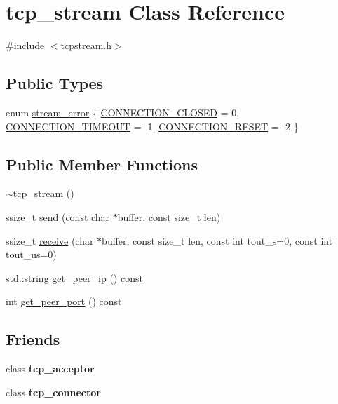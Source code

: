 \hypertarget{classtcp__stream}{}\section{tcp\+\_\+stream Class Reference}
\label{classtcp__stream}


{\ttfamily \#include $<$tcpstream.\+h$>$}

\subsection*{Public Types}
\begin{DoxyCompactItemize}
\item 
enum \hyperlink{classtcp__stream_a1654b581bd89eacae6c5c00bf44bd303}{stream\+\_\+error} \{ \hyperlink{classtcp__stream_a1654b581bd89eacae6c5c00bf44bd303af56262b6dafb79a22137a3459fc8e6c1}{C\+O\+N\+N\+E\+C\+T\+I\+O\+N\+\_\+\+C\+L\+O\+S\+ED} = 0, 
\hyperlink{classtcp__stream_a1654b581bd89eacae6c5c00bf44bd303ab63bfd071e8d91d93ef8723b79563f0e}{C\+O\+N\+N\+E\+C\+T\+I\+O\+N\+\_\+\+T\+I\+M\+E\+O\+UT} = -\/1, 
\hyperlink{classtcp__stream_a1654b581bd89eacae6c5c00bf44bd303a4d1f1bf6e8aa323d3de6ab6254af5e1c}{C\+O\+N\+N\+E\+C\+T\+I\+O\+N\+\_\+\+R\+E\+S\+ET} = -\/2
 \}
\end{DoxyCompactItemize}
\subsection*{Public Member Functions}
\begin{DoxyCompactItemize}
\item 
\hyperlink{classtcp__stream_a5053337af64329d01e1c78cca9d5633e}{$\sim$tcp\+\_\+stream} ()
\item 
ssize\+\_\+t \hyperlink{classtcp__stream_a647c576fed72122b5dc3b6e23c36e210}{send} (const char $\ast$buffer, const size\+\_\+t len)
\item 
ssize\+\_\+t \hyperlink{classtcp__stream_a061ef2188c1cf0eebc7290dbc908f06e}{receive} (char $\ast$buffer, const size\+\_\+t len, const int tout\+\_\+s=0, const int tout\+\_\+us=0)
\item 
std\+::string \hyperlink{classtcp__stream_ac9afe2de961bc45ffb1b614e5718b353}{get\+\_\+peer\+\_\+ip} () const
\item 
int \hyperlink{classtcp__stream_a5562bfad5ec43e358b6bc63386166a50}{get\+\_\+peer\+\_\+port} () const
\end{DoxyCompactItemize}
\subsection*{Friends}
\begin{DoxyCompactItemize}
\item 
\mbox{\label{classtcp__stream_ac753a6c4530e663615a7b160569a446f}} 
class {\bfseries tcp\+\_\+acceptor}
\item 
\mbox{\label{classtcp__stream_a35780d6902edba55e3d463e00117657d}} 
class {\bfseries tcp\+\_\+connector}
\end{DoxyCompactItemize}


